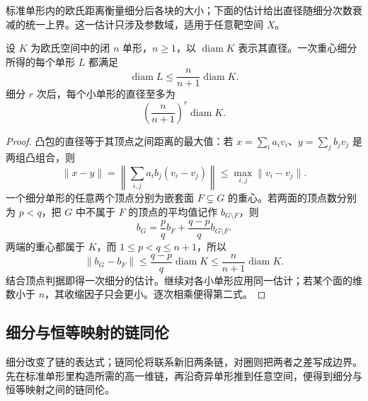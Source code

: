 标准单形内的欧氏距离衡量细分后各块的大小；下面的估计给出直径随细分次数衰减的统一上界。这一估计只涉及参数域，适用于任意靶空间 \(X\)。

\begin{lemma}\label{g2:lem:subdivision-mesh}
	设 \(K\) 为欧氏空间中的闭 \(n\) 单形，\(n\ge1\)，以 \(\operatorname{diam}K\) 表示其直径。一次重心细分所得的每个单形 \(L\) 都满足
	\[
		\operatorname{diam}L\le\frac{n}{n+1}\operatorname{diam}K.
	\]
	细分 \(r\) 次后，每个小单形的直径至多为
	\[
		\left(\frac{n}{n+1}\right)^r\operatorname{diam}K.
	\]
\end{lemma}
\begin{proof}
	凸包的直径等于其顶点之间距离的最大值：若 \(x=\sum_i a_iv_i\)、\(y=\sum_j b_jv_j\) 是两组凸组合，则
	\[
		\|x-y\|
		=\left\|\sum_{i,j}a_ib_j(v_i-v_j)\right\|
		\le\max_{i,j}\|v_i-v_j\|.
	\]
	一个细分单形的任意两个顶点分别为嵌套面 \(F\subsetneq G\) 的重心。若两面的顶点数分别为 \(p<q\)，把 \(G\) 中不属于 \(F\) 的顶点的平均值记作 \(b_{G\setminus F}\)，则
	\[
		b_G=\frac pq b_F+\frac{q-p}{q}b_{G\setminus F}.
	\]
	两端的重心都属于 \(K\)，而 \(1\le p<q\le n+1\)，所以
	\[
		\|b_G-b_F\|
		\le\frac{q-p}{q}\operatorname{diam}K
		\le\frac{n}{n+1}\operatorname{diam}K.
	\]
	结合顶点判据即得一次细分的估计。继续对各小单形应用同一估计；若某个面的维数小于 \(n\)，其收缩因子只会更小。逐次相乘便得第二式。
\end{proof}

\subsection{细分与恒等映射的链同伦}
\label{g2:subsec:0203:02}

细分改变了链的表达式；链同伦将联系新旧两条链，对圈则把两者之差写成边界。先在标准单形里构造所需的高一维链，再沿奇异单形推到任意空间，便得到细分与恒等映射之间的链同伦。

